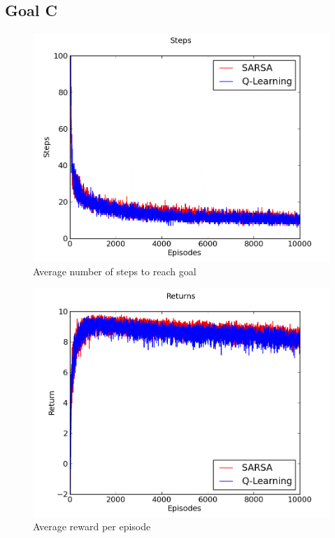\documentclass[a4paper]{article}
\begin{document}
\newpage
\subsection{Goal C}

\begin{figure}[htbp!]
\center
\includegraphics[scale=0.75]{C/steps.png}
\caption{Average number of steps to reach goal}
\end{figure}

\begin{figure}[htbp!]
\center
\includegraphics[scale=0.75]{C/returns.png}
\caption{Average reward per episode}
\end{figure}
\end{document}

